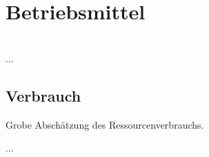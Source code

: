 %
%


\chapter{Betriebsmittel}
\label{Betriebsmittel}

~\\
...

\section{Verbrauch}
\label{BM:Verbrauch}


Grobe Abschätzung des Ressourcenverbrauchs.


...
\\


